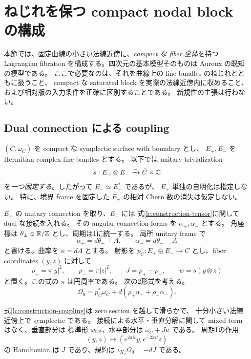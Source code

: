 \section{ねじれを保つ compact nodal block の構成}
\label{lc:construction}

本節では、固定曲線の小さい法線近傍に、\emph{compact な fiber 全体}を持つ
Lagrangian fibration を構成する。四次元の基本模型そのものは
Auroux \cite[\S5.1, Proposition 5.2]{auroux-local} の既知の模型である。
ここで必要なのは、それを曲線上の line bundles のねじれとともに扱うこと、
compact な saturated block を実際の法線近傍内に収めること、
および相対版の入力条件を正確に区別することである。
新規性の主張は行わない。

\subsection{Dual connection による coupling}

$(\bar C,\omega_C)$ を compact な symplectic surface with boundary とし、
$E_+,E_-$ を Hermitian complex line bundles とする。
以下では unitary trivialization
\begin{equation}\label{lc:construction-tensor}
 s:E_+\otimes E_-\xrightarrow{\sim}\bar C\times\mathbb C
\end{equation}
を\emph{一つ固定する}。したがって $E_-\simeq E_+^*$ であるが、
$E_+$ 単独の自明化は指定しない。
特に、境界 frame を固定した $E_+$ の相対 Chern 数の消失は仮定しない。

$E_+$ の unitary connection を取り、$E_-$ には
式\eqref{lc:construction-tensor}に関して dual な接続を入れる。
その angular connection forms を $\alpha_+,\alpha_-$ とする。
角座標は $\theta_\pm\in\mathbb R/\mathbb Z$ とし、周期は1に統一する。
局所 unitary frame で
\[
 \alpha_+=d\theta_++A,\qquad
 \alpha_-=d\theta_--A
\]
と書ける。曲率を $\kappa=dA$ とする。
射影を $p_C:E_+\oplus E_-\to\bar C$ とし、fiber coordinates $(y,z)$ に対して
\begin{equation}\label{lc:construction-coordinates}
 \rho_+=\pi|y|^2,\qquad \rho_-=\pi|z|^2,\qquad
 J=\rho_+-\rho_-,\qquad w=s(y\otimes z)
\end{equation}
と置く。この式の $\pi$ は円周率である。
次の2形式を考える。
\begin{equation}\label{lc:construction-coupling}
 \Omega_0=p_C^*\omega_C+
 d(\rho_+\alpha_++\rho_-\alpha_-).
\end{equation}

\begin{lemma}\label{lc:construction-coupling-lemma}
式\eqref{lc:construction-coupling}は zero section を越して滑らかで、
十分小さい法線近傍上で symplectic である。
接続による水平・垂直分解に関して mixed term はなく、垂直部分は
標準形 $\omega_{\mathbb C^2}$、水平部分は $\omega_C+J\kappa$ である。
周期1の作用
\[
 (y,z)\longmapsto(e^{2\pi it}y,e^{-2\pi it}z)
\]
の Hamiltonian は $J$ であり、規約は $\iota_{X_J}\Omega_0=-dJ$ である。
\end{lemma}

